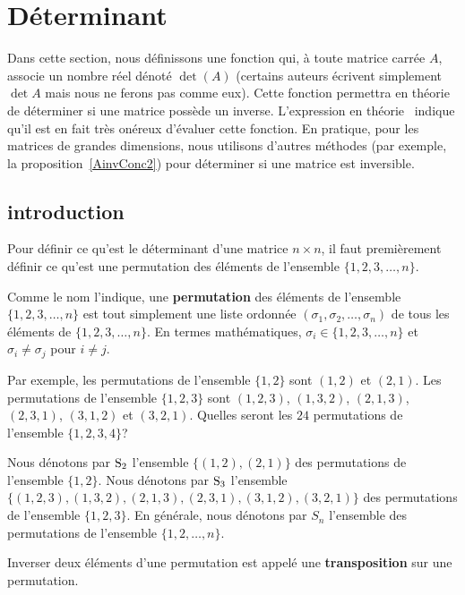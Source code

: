 {\section{Déterminant}\label{DetermSect}

Dans cette section, nous définissons une fonction qui, à toute matrice
carrée $A$, associe un nombre réel dénoté $\det(A)$ (certains auteurs
écrivent simplement $\det A$ mais nous ne ferons pas comme eux).
Cette fonction permettra en théorie de déterminer si une matrice
possède un inverse.  L'expression \lgm en théorie \rgm\ indique
qu'il est en fait très onéreux d'évaluer cette fonction.  En pratique,
pour les matrices de grandes dimensions, nous utilisons d'autres méthodes
(par exemple, la proposition~\ref{AinvConc2}) pour déterminer si une
matrice est inversible.

\subsection{introduction}

Pour définir ce qu'est le déterminant d'une matrice $n \times n$, il
faut premièrement définir ce qu'est une permutation des éléments de
l'ensemble $\{ 1, 2, 3, \ldots, n\}$.

\begin{defn}
Comme le nom l'indique, une {\bfseries permutation} des éléments de
l'ensemble $\{ 1, 2, 3, \ldots, n\}$ est tout simplement une liste
ordonnée $(\sigma_1, \sigma_2, \ldots, \sigma_n)$ de tous les éléments
de $\{1, 2, 3, \ldots, n\}$.  En termes mathématiques, 
$\sigma_i \in \{ 1, 2, 3, \ldots, n\}$ et $\sigma_i \neq \sigma_j$ pour
$i \neq j$.
\end{defn}

Par exemple, les permutations de l'ensemble $\{1,2\}$ sont $(1,2)$ et
$(2,1)$.  Les permutations de l'ensemble $\{1,2,3\}$ sont $(1,2,3)$,
$(1,3,2)$, $(2,1,3)$, $(2,3,1)$, $(3,1,2)$ et $(3,2,1)$.  Quelles
seront les $24$ permutations de l'ensemble $\{1,2,3,4\}$?

Nous dénotons par $\mathrm{S}_{2}$ l'ensemble $\{ (1,2), (2,1) \}$ des
permutations de l'ensemble $\{1,2\}$.  Nous dénotons par $\mathrm{S}_{3}$
l'ensemble $\{ (1,2,3), (1,3,2), (2,1,3), (2,3,1), (3,1,2), (3,2,1)
\}$ des permutations de l'ensemble $\{1,2,3\}$.  En générale, nous
dénotons par $S_{n}$ l'ensemble des permutations de l'ensemble
$\{1,2,\ldots, n\}$. 

\begin{defn}
Inverser deux éléments d'une permutation est appelé une
{\bfseries transposition} sur une permutation.
\end{defn}

}
